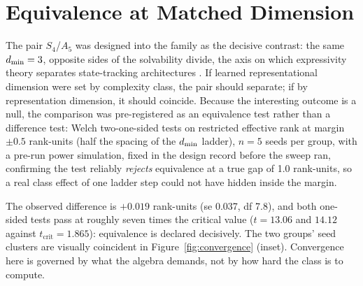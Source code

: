 \section{Equivalence at Matched Dimension}
\label{sec:equivalence}

The pair $S_4$/$A_5$ was designed into the family as the decisive
contrast: the same $d_{\min} = 3$, opposite sides of the solvability
divide, the axis on which expressivity theory separates state-tracking
architectures \citep{merrill2024illusion, grazzi2025negative,
siems2025deltaproduct}. If learned representational dimension were set
by complexity class, the pair should separate; if by representation
dimension, it should coincide. Because the interesting outcome is a
null, the comparison was pre-registered as an equivalence test rather
than a difference test: Welch two-one-sided tests on restricted
effective rank at margin $\pm 0.5$ rank-units (half the spacing of the
$d_{\min}$ ladder), $n = 5$ seeds per group, with a pre-run power
simulation, fixed in the design record before the sweep ran, confirming
the test reliably \emph{rejects} equivalence at a true gap of 1.0
rank-units, so a real class effect of one ladder step could not have
hidden inside the margin.

The observed difference is $+0.019$ rank-units (se 0.037, df 7.8), and
both one-sided tests pass at roughly seven times the critical value
($t = 13.06$ and $14.12$ against $t_{\mathrm{crit}} = 1.865$):
equivalence is declared decisively.
The two groups' seed clusters are visually coincident in
Figure~\ref{fig:convergence} (inset). Convergence here is governed by
what the algebra demands, not by how hard the class is to compute.
